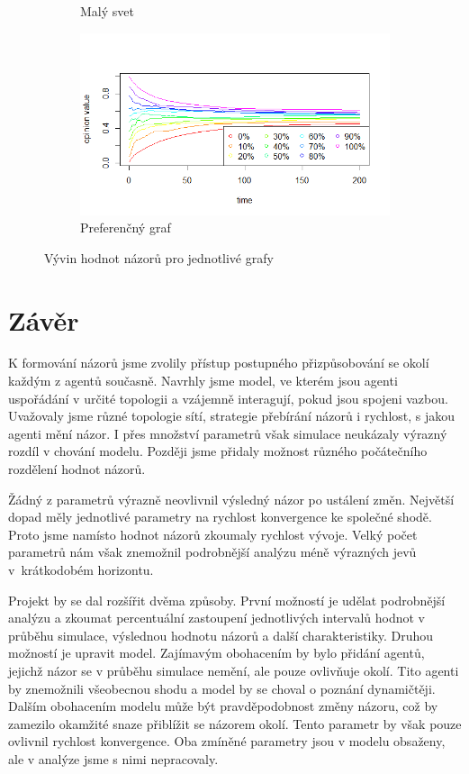 \documentclass[10pt,a4paper]{report}
\begin{document}
\begin{figure}[h]
\begin{subfigure}[b]{0.475\textwidth}
      \caption[]%
      {{\small Malý svet}}    
      \label{fig:prubeh-maly svet}
  \end{subfigure}
  \quad
  \begin{subfigure}[b]{0.475\textwidth}   
      \centering 
      \includegraphics[width=\textwidth]{plots/max-values/prefferentialMaxV.png}
      \caption[]%
      {{\small Preferenčný graf}}    
      \label{fig:prubeh-preferencni}
  \end{subfigure}
  \caption[]
  {\small Vývin hodnot názorů pro jednotlivé grafy}
  \label{fig:prubeh-grafy}
\end{figure}
 
\chapter{Závěr}
K formování názorů jsme zvolily přístup postupného přizpůsobování se okolí každým z agentů současně. Navrhly jsme model, ve kterém jsou agenti uspořádání v určité topologii a vzájemně interagují, pokud jsou spojeni vazbou. Uvažovaly jsme různé topologie sítí, strategie přebírání názorů i rychlost, s jakou agenti mění názor. I přes množství parametrů však simulace neukázaly výrazný rozdíl v chování modelu. Později jsme přidaly možnost různého počátečního rozdělení hodnot názorů.

Žádný z parametrů výrazně neovlivnil výsledný názor po ustálení změn. Největší dopad měly jednotlivé parametry na rychlost konvergence ke společné shodě. Proto jsme namísto hodnot názorů zkoumaly rychlost vývoje. Velký počet parametrů nám však znemožnil podrobnější analýzu méně výrazných jevů v~krátkodobém horizontu.

Projekt by se dal rozšířit dvěma způsoby. První možností je udělat podrobnější analýzu a zkoumat percentuální zastoupení jednotlivých intervalů hodnot v průběhu simulace, výslednou hodnotu názorů a další charakteristiky. Druhou možností je upravit model. Zajímavým obohacením by bylo přidání agentů, jejichž názor se v průběhu simulace nemění, ale pouze ovlivňuje okolí. Tito agenti by znemožnili všeobecnou shodu a model by se choval o poznání dynamičtěji. Dalším obohacením modelu může být pravděpodobnost změny názoru, což by zamezilo okamžité snaze přiblížit se názorem okolí. Tento parametr by však pouze ovlivnil rychlost konvergence. Oba zmíněné parametry jsou v modelu obsaženy, ale v analýze jsme s nimi nepracovaly.
\end{document}
